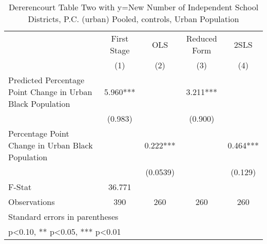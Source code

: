 \begin{table}[htbp]\centering
\def\sym#1{\ifmmode^{#1}\else\(^{#1}\)\fi}
\caption{Dererencourt Table Two with y=New Number of Independent School Districts, P.C. (urban)  Pooled,  controls, Urban Population}
\begin{tabular}{l*{4}{c}}
\toprule
                    & First Stage   &         OLS   &Reduced Form   &        2SLS   \\
                    &\multicolumn{1}{c}{(1)}   &\multicolumn{1}{c}{(2)}   &\multicolumn{1}{c}{(3)}   &\multicolumn{1}{c}{(4)}   \\
\midrule
Predicted Percentage Point Change in Urban Black Population&       5.960***&               &       3.211***&               \\
                    &     (0.983)   &               &     (0.900)   &               \\
\addlinespace
Percentage Point Change in Urban Black Population&               &       0.222***&               &       0.464***\\
                    &               &    (0.0539)   &               &     (0.129)   \\
\midrule
F-Stat              &      36.771   &               &               &               \\
Observations        &         390   &         260   &         260   &         260   \\
\bottomrule
\multicolumn{5}{l}{\footnotesize Standard errors in parentheses}\\
\multicolumn{5}{l}{\footnotesize * p<0.10, ** p<0.05, *** p<0.01}\\
\end{tabular}
\end{table}
